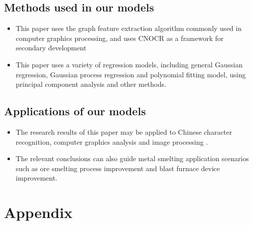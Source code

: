 \documentclass{apmcmthesis}
\begin{document}
\subsection{Methods used in our models}
\begin{itemize}
\item This paper uses the graph feature extraction algorithm commonly used in computer graphics processing, and uses CNOCR as a framework for secondary development

\item This paper uses a variety of regression models, including general Gaussian regression, Gaussian process regression and polynomial fitting model, using principal component analysis and other methods.

\end{itemize}
\subsection{Applications of our models}
\begin{itemize}
\item The research results of this paper may be applied to Chinese character recognition, computer graphics analysis and image processing .
\item The relevant conclusions can also guide metal smelting application scenarios such as ore smelting process improvement and blast furnace device improvement.

\end{itemize}


\newpage


\newpage

\section{Appendix}
\end{document}
